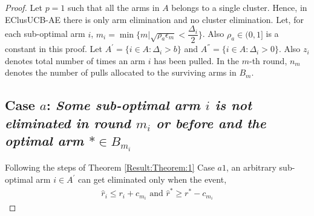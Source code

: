 \begin{proof}
Let $p=1$ such that all the arms in $A$ belongs to a single cluster. Hence, in EClusUCB-AE there is only arm elimination and no cluster elimination. Let, for each sub-optimal arm ${i}$, $m_{i}=\min{\lbrace m|\sqrt{\rho_{a}\epsilon_{m}} < \dfrac{\Delta_{i}}{2} \rbrace}$. Also $\rho_{a}\in (0,1]$ is a constant in this proof. Let $A^{'}=\lbrace i\in A: \Delta_{i} > b \rbrace$ and $A^{''}=\lbrace i\in A: \Delta_{i} > 0 \rbrace$. Also $z_{i}$ denotes total number of times an arm $i$ has been pulled. In the $m$-th round, $n_{m}$ denotes the number of pulls allocated to the surviving arms in $B_{m}$. 


\subsection*{Case $a$: \textit{Some sub-optimal arm ${i}$ is not eliminated in round $m_{i}$ or before and the optimal arm ${*}\in B_{m_{i}}$}}

  
	Following the steps of Theorem \ref{Result:Theorem:1} Case $a1$, an arbitrary sub-optimal arm ${i}\in A^{'}$ can get eliminated only when the event,
	\begin{align}
	\hat{r}_{i}  \le r_{i} + c_{m_i} \text{ and } \label{eq:appA:armelim-casea}
 	\hat{r}^{*}\geq  r^{*} - c_{m_i}
	\end{align}
	

\end{proof}
